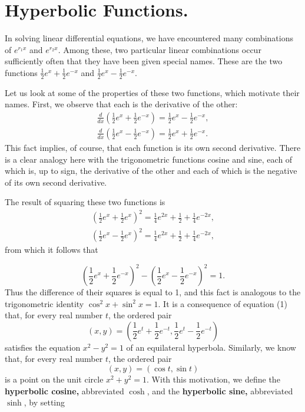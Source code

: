 \section{Hyperbolic Functions.} In solving linear differential equations, we have encountered many combinations of $e^{r_1x}$ and $e^{r_2x}$. Among these, two particular linear combinations occur sufficiently often that they have been given special names. These are the two functions $\frac{1}{2} e^x + \frac{1}{2} e^{-x}$ and $\frac{1}{2} e^x - \frac{1}{2} e^{-x}$.

Let us look at some of the properties of these two functions, which motivate their names. First, we observe that each is the derivative of the other: 
\begin{eqnarray*}
\frac{d}{dx} (\frac{1}{2} e^x + \frac{1}{2} e^{-x}) = \frac{1}{2} e^x - \frac{1}{2} e^{-x} ,\\
\frac{d}{dx} (\frac{1}{2} e^x - \frac{1}{2} e^{-x}) = \frac{1}{2} e^x + \frac{1}{2} e^{-x} .
\end{eqnarray*}
This fact implies, of course, that each function is its own second derivative. There is a clear analogy here with the trigonometric functions cosine and sine, each of which is, up to sign, the derivative of the other and each of which is the negative of its own second derivative.

The result of squaring these two functions is 
\begin{eqnarray*}
(\frac{1}{2} e^x + \frac{1}{2} e^x)^2 = \frac{1}{4} e^{2x} + \frac{1}{2} + \frac{1}{4} e^{-2x},\\
(\frac{1}{2} e^x - \frac{1}{2} e^x)^2 =  \frac{1}{4} e^{2x} + \frac{1}{2} + \frac{1}{4} e^{-2x},
\end{eqnarray*} 
from which it follows that

\begin{equation}
(\frac{1}{2} e^x + \frac{1}{2} e^{-x})^2 - (\frac{1}{2} e^x - \frac{1}{2} e^{-x})^2 = 1.  
\label{eq11.6.1}
\end{equation}
Thus the difference of their squares is equal to 1, and this fact is analogous to the trigonometric identity $\cos^2x + \sin^2x = 1$. It is a consequence of equation (1) that, for every real number $t$, the ordered pair
$$
(x,y) = (\frac{1}{2} e^t + \frac{1}{2} e^{-t}, \frac{1}{2} e^t - \frac{1}{2} e^{-t})
$$
satisfies the equation $x^2 - y^2 = 1$ of an equilateral hyperbola. Similarly, we know that, for every real number $t$, the ordered pair
$$
(x, y) = (\cos t, \sin t)
$$
is a point on the unit circle $x^2 + y^2 = 1$. With this motivation, we define the \textbf{hyperbolic cosine,} abbreviated $\cosh$, and the \textbf{hyperbolic sine,} abbreviated $\sinh$, by setting

